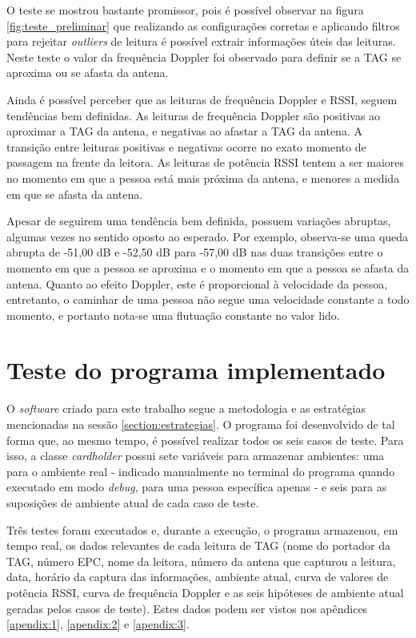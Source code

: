  O teste se mostrou bastante promissor, pois é possível observar na figura \ref{fig:teste_preliminar} que realizando as configurações corretas e aplicando filtros para rejeitar \textit{outliers} de leitura é possível extrair informações úteis das leituras. Neste teste o valor da frequência Doppler foi observado para definir se a TAG se aproxima ou se afasta da antena.
 
 Ainda é possível perceber que as leituras de frequência Doppler e RSSI, seguem tendências bem definidas. As leituras de frequência Doppler são positivas ao aproximar a TAG da antena, e negativas ao afastar a TAG da antena. A transição entre leituras positivas e negativas ocorre no exato momento de passagem na frente da leitora. As leituras de potência RSSI tentem a ser maiores no momento em que a pessoa está mais próxima da antena, e menores a medida em que se afasta da antena.
 
 Apesar de seguirem uma tendência bem definida, possuem variações abruptas, algumas vezes no sentido oposto ao esperado. Por exemplo, observa-se uma queda abrupta de -51,00 dB e -52,50 dB para -57,00 dB nas duas transições entre o momento em que a pessoa se aproxima e o momento em que a pessoa se afasta da antena. Quanto ao efeito Doppler, este é proporcional à velocidade da pessoa, entretanto, o caminhar de uma pessoa não segue uma velocidade constante a todo momento, e portanto nota-se uma flutuação constante no valor lido.

\section{Teste do programa implementado}

O \textit{software} criado para este trabalho segue a metodologia e as estratégias mencionadas na sessão \ref{section:estrategias}. O programa foi desenvolvido de tal forma que, ao mesmo tempo, é possível realizar todos os seis casos de teste. Para isso, a classe \textit{cardholder} possui sete variáveis para armazenar ambientes: uma para o ambiente real - indicado manualmente no terminal do programa quando executado em modo \textit{debug}, para uma pessoa específica apenas - e seis para as suposições de ambiente atual de cada caso de teste.

Três testes foram executados e, durante a execução, o programa armazenou, em tempo real, os dados relevantes de cada leitura de TAG (nome do portador da TAG, número EPC, nome da leitora, número da antena que capturou a leitura, data, horário da captura das informações, ambiente atual, curva de valores de potência RSSI, curva de frequência Doppler e as seis hipóteses de ambiente atual geradas pelos casos de teste). Estes dados podem ser vistos nos apêndices \ref{apendix:1}, \ref{apendix:2} e \ref{apendix:3}.

